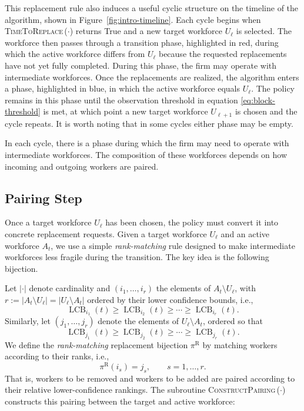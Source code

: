 \documentclass[opre,blindrev]{informs3}
\newcommand{\LCB}{\operatorname{LCB}}
\newcommand{\TimeToReplace}{\textsc{TimeToReplace}\,}
\newcommand{\ConstructPairing}{\textsc{ConstructPairing}\,}
\begin{document}
\vspace{-.2in}

This replacement rule also induces a useful cyclic structure on the timeline of the algorithm, shown in Figure~\ref{fig:intro-timeline}. Each cycle begins when \TimeToReplace(\(\cdot\)) returns True and a new target workforce \(U_\ell\) is selected. The workforce then passes through a transition phase, highlighted in red, during which the active workforce differs from \(U_\ell\) because the requested replacements have not yet fully completed. During this phase, the firm may operate with intermediate workforces. Once the replacements are realized, the algorithm enters a phase, highlighted in blue, in which the active workforce equals \(U_\ell\). The policy remains in this phase until the observation threshold in equation \eqref{eq:block-threshold} is met, at which point a new target workforce \(U_{\ell+1}\) is chosen and the cycle repeats. It is worth noting that in some cycles either phase may be empty. 

In each cycle, there is a phase during which the firm may need to operate with intermediate workforces. The composition of these workforces depends on how incoming and outgoing workers are paired.

\vspace{-.1in}
\subsection{Pairing Step}
Once a target workforce \(U_{\ell}\) has been chosen, the policy must convert it into concrete replacement requests. Given a target workforce \(U_{\ell}\) and an active workforce \(A_t\), we use a simple \emph{rank-matching} rule designed to make intermediate workforces less fragile during the transition. The key idea is the following bijection.

Let \(|\cdot|\) denote cardinality and \((i_1,\dots,i_r)\) the elements of \(A_{t}\setminus U_\ell\), with \(r := |A_{t}\setminus U_\ell| = |U_\ell\setminus A_{t}|\) ordered by their lower confidence bounds, i.e., 
\[
\LCB_{i_1}(t) \ge \LCB_{i_2}(t) \ge \cdots \ge \LCB_{i_r}(t).
\]
Similarly, let \((j_1,\dots,j_r)\) denote the elements of \(U_\ell\setminus A_{t}\), ordered so that
\[
\LCB_{j_1}(t) \ge \LCB_{j_2}(t) \ge \cdots \ge \LCB_{j_r}(t).
\]
We define the \emph{rank-matching} replacement bijection \(\pi^{\mathrm R}\) by matching workers according to their ranks, i.e., 
\begin{equation}\label{eq:rm-bijection}
    \pi^{\mathrm R}(i_s) = j_s, \qquad s=1,\dots,r.
\end{equation}
That is, workers to be removed and workers to be added are paired according to their relative lower-confidence rankings. The subroutine \ConstructPairing(\(\cdot\)) constructs this pairing between the target and active workforce:
\end{document}
